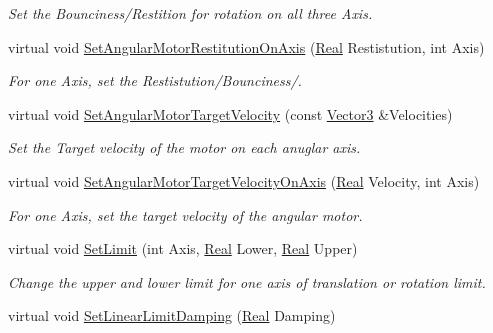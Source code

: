 \begin{DoxyCompactItemize}
\begin{DoxyCompactList}\small\item\em Set the Bounciness/Restition for rotation on all three Axis. \item\end{DoxyCompactList}\item 
virtual void \hyperlink{classMezzanine_1_1Generic6DofConstraint_a64b2f088046feedbedbc6277dc6bbe1b}{SetAngularMotorRestitutionOnAxis} (\hyperlink{namespaceMezzanine_a726731b1a7df72bf3583e4a97282c6f6}{Real} Restistution, int Axis)
\begin{DoxyCompactList}\small\item\em For one Axis, set the Restistution/Bounciness/. \item\end{DoxyCompactList}\item 
virtual void \hyperlink{classMezzanine_1_1Generic6DofConstraint_a83e6642525b862d2b0f213f4196cfee6}{SetAngularMotorTargetVelocity} (const \hyperlink{classMezzanine_1_1Vector3}{Vector3} \&Velocities)
\begin{DoxyCompactList}\small\item\em Set the Target velocity of the motor on each anuglar axis. \item\end{DoxyCompactList}\item 
virtual void \hyperlink{classMezzanine_1_1Generic6DofConstraint_a40d21ce4c86538080ab574e5ddee5db8}{SetAngularMotorTargetVelocityOnAxis} (\hyperlink{namespaceMezzanine_a726731b1a7df72bf3583e4a97282c6f6}{Real} Velocity, int Axis)
\begin{DoxyCompactList}\small\item\em For one Axis, set the target velocity of the angular motor. \item\end{DoxyCompactList}\item 
virtual void \hyperlink{classMezzanine_1_1Generic6DofConstraint_af8d66ec56818e651c0e429b944f7b823}{SetLimit} (int Axis, \hyperlink{namespaceMezzanine_a726731b1a7df72bf3583e4a97282c6f6}{Real} Lower, \hyperlink{namespaceMezzanine_a726731b1a7df72bf3583e4a97282c6f6}{Real} Upper)
\begin{DoxyCompactList}\small\item\em Change the upper and lower limit for one axis of translation or rotation limit. \item\end{DoxyCompactList}\item 
virtual void \hyperlink{classMezzanine_1_1Generic6DofConstraint_a8bd3f660e157fb666872e09d32e7ca1c}{SetLinearLimitDamping} (\hyperlink{namespaceMezzanine_a726731b1a7df72bf3583e4a97282c6f6}{Real} Damping)

\end{DoxyCompactItemize}
